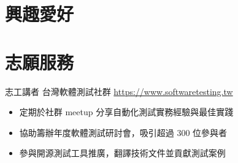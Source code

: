 \documentclass[a4paper, serif, 10pt]{moderncv}
\begin{document}
\section{興趣愛好}

\section{志願服務}

        {志工講者}
        {台灣軟體測試社群}
        {\url{https://www.softwaretesting.tw}}
        {}
        {\begin{itemize}
\item 定期於社群 meetup 分享自動化測試實務經驗與最佳實踐
\item 協助籌辦年度軟體測試研討會，吸引超過 300 位參與者
\item 參與開源測試工具推廣，翻譯技術文件並貢獻測試案例
\end{itemize}}
    
\end{document}
